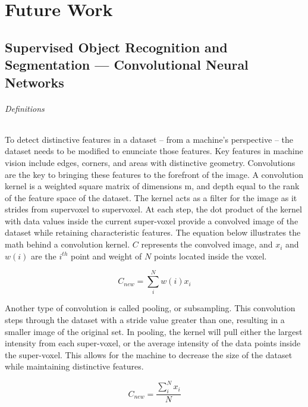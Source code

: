 \documentclass[12pt]{drexelthesis}
\let\Oldsection\section
\renewcommand{\section}{\FloatBarrier\Oldsection}
\begin{document}
\chapter{Future Work}
\label{chap:future}


\section{Supervised Object Recognition and Segmentation --- Convolutional Neural Networks}
\subparagraph{Definitions}
To detect distinctive features in a dataset – from a machine’s perspective – the dataset needs to be modified to enunciate those features. Key features in machine vision include edges, corners, and areas with distinctive geometry. Convolutions are the key to bringing these features to the forefront of the image.
A convolution kernel is a weighted square matrix of dimensions m, and depth equal to the rank of the feature space of the dataset. The kernel acts as a filter for the image as it strides from supervoxel to supervoxel. At each step, the dot product of the kernel with data values inside the current super-voxel provide a convolved image of the dataset while retaining characteristic features. The equation below illustrates the math behind a convolution kernel. $C$ represents the convolved image, and $x_{i}$ and $w(i)$ are the $i^{th}$ point and weight of $N$ points located inside the voxel.

\begin{equation}
	C_{new} = \sum_{i}^{N}  w(i) x_{i}
\end{equation}

Another type of convolution is called pooling, or subsampling. This convolution steps through the dataset with a stride value greater than one, resulting in a smaller image of the original set. In pooling, the kernel will pull either the largest intensity from each super-voxel, or the average intensity of the data points inside the super-voxel. This allows for the machine to decrease the size of the dataset while maintaining distinctive features.

\begin{equation}
	C_{new} = \frac{\sum_{i}^{N}  x_{i}}{N}
\end{equation}
\end{document}
